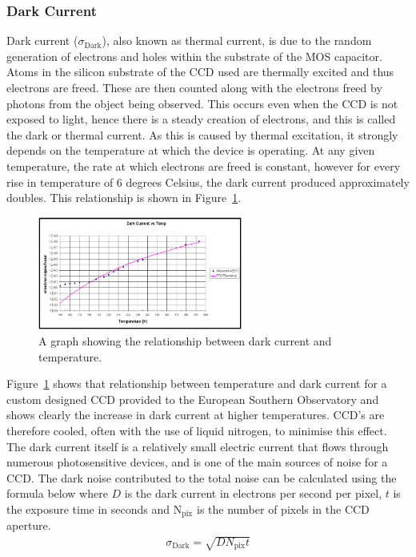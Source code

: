 		\subsubsection{Dark Current} %
		\label{ssub:dark_current}
			Dark current ($\sigma_\text{Dark}$), also known as thermal current, is due to the random generation of electrons and holes within the substrate of the MOS capacitor. Atoms in the silicon substrate of the CCD used are thermally excited and thus electrons are freed. These are then counted along with the electrons freed by photons from the object being observed. This occurs even when the CCD is not exposed to light, hence there is a steady creation of electrons, and this is called the dark or thermal current. As this is caused by thermal excitation, it strongly depends on the temperature at which the device is operating. At any given temperature, the rate at which electrons are freed is constant, however for every rise in temperature of 6 degrees Celsius, the dark current produced approximately doubles\cite{Astronomical_Image_Processing}. This relationship is shown in Figure~\ref{fig:dark_current_vs_temp}\cite{Southern_Observatory_throughput}.
			\begin{figure}[htbp]
				\centering
				\includegraphics[width=0.6\textwidth]{../Images/Dark.png}
				\caption{A graph showing the relationship between dark current and temperature.\label{fig:dark_current_vs_temp}}
			\end{figure}

			Figure~\ref{fig:dark_current_vs_temp} shows that relationship between temperature and dark current for a custom designed CCD provided to the European Southern Observatory and shows clearly the increase in dark current at higher temperatures. CCD's are therefore cooled, often with the use of liquid nitrogen, to minimise this effect. The dark current itself is a relatively small electric current that flows through numerous photosensitive devices, and is one of the main sources of noise for a CCD. The dark noise contributed to the total noise can be calculated using the formula below where $D$ is the dark current in electrons per second per pixel, $t$ is the exposure time in seconds and N$_\text{pix}$ is the number of pixels in the CCD aperture.
			\begin{align}
				\sigma_\text{Dark} = \sqrt{DN_\text{pix}t}
			\end{align}

